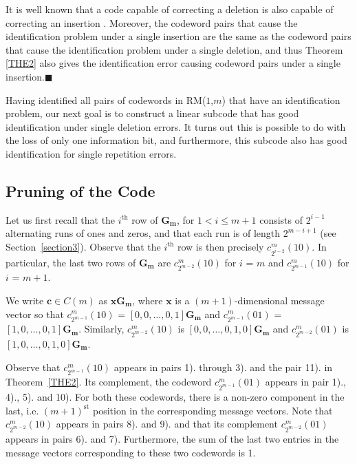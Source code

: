 \begin{remark}
It is well known that a code capable of correcting a deletion is
also capable of correcting an insertion \cite{lev:66}. Moreover,
the codeword pairs that cause the identification problem under a
single insertion are the same as the codeword pairs that cause the
identification problem under a single deletion, and thus Theorem
\ref{THE2} also gives the identification error causing codeword
pairs under a single insertion.\hfill$\blacksquare$
\end{remark}
Having identified all pairs of codewords in RM($1$,$m$) that have
an identification problem, our next goal is to construct a linear
subcode that has good identification under single deletion errors.
It turns out this is possible to do with the loss of only one
information bit, and furthermore, this subcode also has good
identification for single repetition errors.

\subsection{Pruning of the Code}

Let us first recall that the $i^{\text{th}}$ row of
$\mathbf{G_m}$, for $1 <i \leq m+1$ consists of $2^{i-1}$
alternating runs of ones and zeros, and that each run is of length
$2^{m-i+1}$ (see Section~\ref{section3}). Observe that the
$i^{\text{th}}$ row is then precisely $c_{2^{i-2}}^m(10)$. In
particular, the last two rows of $\mathbf{G_m}$ are
$c_{2^{m-2}}^m(10)$ for $i$ = $m$ and $c_{2^{m-1}}^m(10)$ for $i$
= $m+1$.

We write $\mathbf{c} \in C(m)$ as $\mathbf{x} \mathbf{G_m}$, where
$\mathbf{x}$ is a $(m+1)$-dimensional message vector so that
$c_{2^{m-1}}^m(10)$ = $[0,0,\ldots,0,1] \mathbf{G_m}$ and
$c_{2^{m-1}}^m(01)$ = $[1,0,\ldots,0,1] \mathbf{G_m}$. Similarly,
$c_{2^{m-2}}^m(10)$ is $[0,0,\ldots,0,1,0] \mathbf{G_m}$ and
$c_{2^{m-2}}^m(01)$ is $[1,0,\ldots,0,1,0] \mathbf{G_m}$.

Observe that $c_{2^{m-1}}^m(10)$ appears in pairs 1). through 3).
and the pair 11). in Theorem~\ref{THE2}. Its complement, the
codeword $c_{2^{m-1}}^m(01)$ appears in pair 1)., 4)., 5). and
10). For both these codewords, there is a non-zero component in
the last, i.e. $(m+1)^{\text{st}}$ position in the corresponding
message vectors. Note that $c_{2^{m-2}}^m(10)$ appears in pairs
8). and 9). and that its complement $c_{2^{m-2}}^m(01)$ appears in
pairs 6). and 7). Furthermore, the sum of the last two entries in
the message vectors corresponding to these two codewords is 1.

